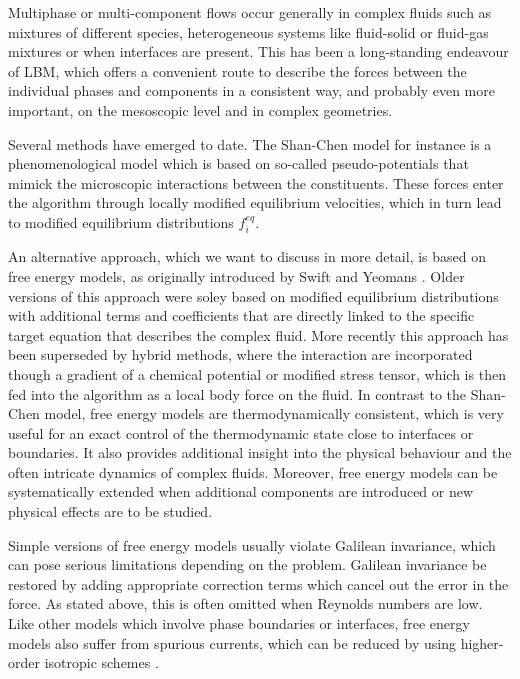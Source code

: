 \documentclass[8.5pt,twoside,twocolumn]{article}
\begin{document}
Multiphase or multi-component flows occur generally in complex fluids such as 
mixtures of different species, heterogeneous systems like fluid-solid or fluid-gas mixtures 
or when interfaces are present. This has been a long-standing endeavour of LBM, which 
offers a convenient route to describe the forces  
between the individual phases and components in a consistent way, and probably even more important, 
on the mesoscopic level and in complex geometries. 

Several methods have emerged to date. The Shan-Chen model \cite{Shan:1993} for instance is a 
phenomenological model which is based on so-called pseudo-potentials that mimick the microscopic 
interactions between the constituents. These forces enter the algorithm through locally modified equilibrium
velocities, which in turn lead to modified equilibrium distributions $f_i^{eq}$.

An alternative approach, which we want to discuss in more detail, is based on free energy models,
as originally introduced by Swift and Yeomans \cite{Swift:1995, Swift:1996}.
Older versions of this approach were soley based on modified equilibrium distributions with
additional terms and coefficients that are directly linked to the specific target equation that 
describes the complex fluid.
More recently this approach has been superseded by hybrid methods, where the interaction 
are incorporated though a gradient of a chemical potential or modified stress tensor,
which is then fed into the algorithm as a local body force on the fluid. 
In contrast to the Shan-Chen model, free energy models are thermodynamically consistent, 
which is very useful for an exact control of the thermodynamic
state close to interfaces or boundaries. It also provides additional insight into the physical behaviour and the 
often intricate dynamics of complex fluids.
Moreover, free energy models can be systematically extended when additional components are 
introduced or new physical effects are to be studied.

Simple versions of free energy models usually violate Galilean invariance, which can pose 
serious limitations depending on the problem. 
Galilean invariance be restored by adding appropriate correction terms which cancel out the
error in the force. As stated above, this is often omitted when Reynolds numbers are low.  
Like other models which involve phase boundaries or interfaces, free energy models also suffer from spurious 
currents, which can be reduced by using higher-order isotropic schemes \cite{Connington:2012}.
\end{document}

